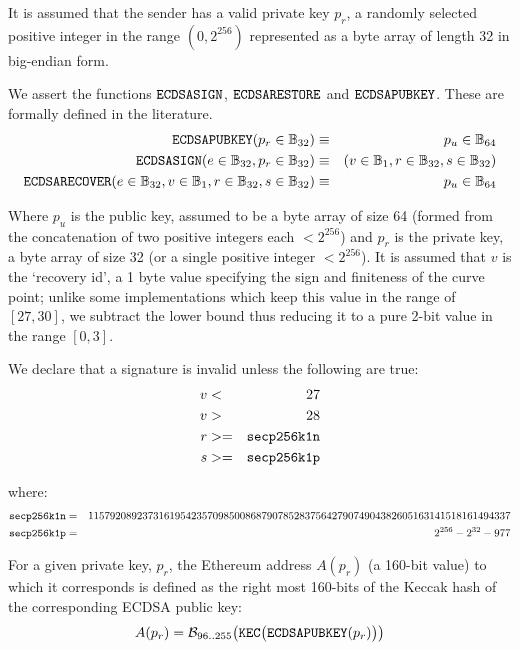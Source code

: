 \documentclass[9pt,oneside]{amsart}
\begin{document}
It is assumed that the sender has a valid private key $p_r$, a randomly selected positive integer in the range $(0, 2^{256})$ represented as a byte array of length 32 in big-endian form.

We assert the functions $\mathtt{\small ECDSASIGN}$, $\mathtt{\small ECDSARESTORE}$ and $\mathtt{\small ECDSAPUBKEY}$. These are formally defined in the literature.
\begin{eqnarray}
\mathtt{\small ECDSAPUBKEY}(p_r \in \mathbb{B}_{32}) & \equiv & p_u \in \mathbb{B}_{64} \\
\mathtt{\small ECDSASIGN}(e \in \mathbb{B}_{32}, p_r \in \mathbb{B}_{32}) & \equiv & (v \in \mathbb{B}_{1}, r \in \mathbb{B}_{32}, s \in \mathbb{B}_{32}) \\
\mathtt{\small ECDSARECOVER}(e \in \mathbb{B}_{32}, v \in \mathbb{B}_{1}, r \in \mathbb{B}_{32}, s \in \mathbb{B}_{32}) & \equiv & p_u \in \mathbb{B}_{64}
\end{eqnarray}

Where $p_u$ is the public key, assumed to be a byte array of size 64 (formed from the concatenation of two positive integers each $< 2^{256}$) and $p_r$ is the private key, a byte array of size 32 (or a single positive integer $< 2^{256}$). It is assumed that $v$ is the `recovery id', a 1 byte value specifying the sign and finiteness of the curve point; unlike some implementations which keep this value in the range of $[27, 30]$, we subtract the lower bound thus reducing it to a pure 2-bit value in the range $[0, 3]$.

We declare that a signature is invalid unless the following are true:
\begin{eqnarray}
v &<& 27\\
v &>& 28\\
r &>=& \mathtt{\tiny secp256k1n}\\
s &>=& \mathtt{\tiny secp256k1p}\\
\end{eqnarray}

where:
\begin{eqnarray}
\mathtt{\tiny secp256k1n} &=& 115792089237316195423570985008687907852837564279074904382605163141518161494337\\
\mathtt{\tiny secp256k1p} &=& 2^{256} - 2^{32} - 977\\
\end{eqnarray}

For a given private key, $p_r$, the Ethereum address $A(p_r)$ (a 160-bit value) to which it corresponds is defined as the right most 160-bits of the Keccak hash of the corresponding ECDSA public key:
\begin{equation}
A(p_r) = \mathcal{B}_{96..255}\big(\mathtt{\tiny KEC}\big( \mathtt{\small ECDSAPUBKEY}(p_r) \big) \big)
\end{equation}
\end{document}
